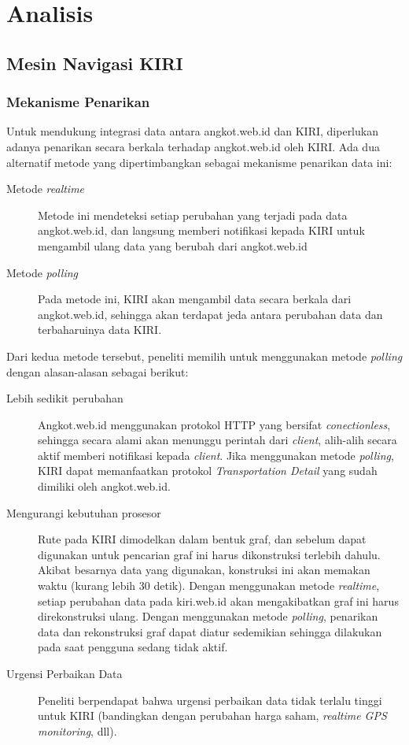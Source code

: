 \chapter{Analisis}
\label{chap:analisis}

\section{Mesin Navigasi KIRI}
\label{sec:mesin_navigasi_kiri}

\subsection{Mekanisme Penarikan}

Untuk mendukung integrasi data antara angkot.web.id dan KIRI, diperlukan adanya penarikan secara berkala terhadap angkot.web.id oleh KIRI. Ada dua alternatif metode yang dipertimbangkan sebagai mekanisme penarikan data ini:

\begin{description}
	\item[Metode \textit{realtime}] Metode ini mendeteksi setiap perubahan yang terjadi pada data angkot.web.id, dan langsung memberi notifikasi kepada KIRI untuk mengambil ulang data yang berubah dari angkot.web.id
	\item[Metode \textit{polling}] Pada metode ini, KIRI akan mengambil data secara berkala dari angkot.web.id, sehingga akan terdapat jeda antara perubahan data dan terbaharuinya data KIRI.
\end{description}

Dari kedua metode tersebut, peneliti memilih untuk menggunakan metode \textit{polling} dengan alasan-alasan sebagai berikut:

\begin{description}
	\item[Lebih sedikit perubahan] Angkot.web.id menggunakan protokol HTTP yang bersifat \textit{conectionless}, sehingga secara alami akan menunggu perintah dari \textit{client}, alih-alih secara aktif memberi notifikasi kepada \textit{client}. Jika menggunakan metode \textit{polling}, KIRI dapat memanfaatkan protokol \textit{Transportation Detail} yang sudah dimiliki oleh angkot.web.id.
	\item[Mengurangi kebutuhan prosesor] Rute pada KIRI dimodelkan dalam bentuk graf, dan sebelum dapat digunakan untuk pencarian graf ini harus dikonstruksi terlebih dahulu. Akibat besarnya data yang digunakan, konstruksi ini akan memakan waktu (kurang lebih 30 detik). Dengan menggunakan metode \textit{realtime}, setiap perubahan data pada kiri.web.id akan mengakibatkan graf ini harus direkonstruksi ulang. Dengan menggunakan metode \textit{polling}, penarikan data dan rekonstruksi graf dapat diatur sedemikian sehingga dilakukan pada saat pengguna sedang tidak aktif.
	\item[Urgensi Perbaikan Data] Peneliti berpendapat bahwa urgensi perbaikan data tidak terlalu tinggi untuk KIRI (bandingkan dengan perubahan harga saham, \textit{realtime GPS monitoring}, dll).
\end{description}

